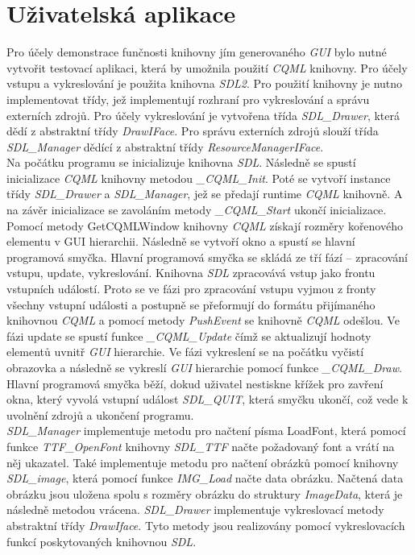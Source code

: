 \documentclass[11pt,twoside,a4paper]{book}
\begin{document}
\section{Uživatelská aplikace}
Pro účely demonstrace funčnosti knihovny jím generovaného \textit{GUI} bylo nutné vytvořit testovací aplikaci, která by umožnila použití \textit{CQML} knihovny.
Pro účely vstupu a vykreslování je použita knihovna \textit{SDL2}. Pro použití knihovny je nutno implementovat třídy, jež implementují rozhraní pro vykreslování a správu externích zdrojů. Pro účely vykreslování je vytvořena třída \textit{SDL\_Drawer}, která dědí z abstraktní třídy \textit{DrawIFace}. Pro správu externích zdrojů slouží třída \textit{SDL\_Manager} dědící z abstraktní třídy \textit{ResourceManagerIFace}.\\
Na počátku programu se inicializuje knihovna \textit{SDL}. Následně se spustí inicializace \textit{CQML} knihovny metodou \textit{\_CQML\_Init}. Poté se vytvoří instance třídy \textit{SDL\_Drawer} a \textit{SDL\_Manager}, jež se předají runtime \textit{CQML} knihovně. A na závěr inicializace se zavoláním metody \textit{\_CQML\_Start} ukončí inicializace. Pomocí metody GetCQMLWindow knihovny \textit{CQML} získají rozměry kořenového elementu v GUI hierarchii.
Následně se vytvoří okno a spustí se hlavní programová smyčka. Hlavní programová smyčka se skládá ze tří fází – zpracování vstupu, update, vykreslování.
Knihovna \textit{SDL} zpracovává vstup jako frontu vstupních událostí. Proto se ve fázi pro zpracování vstupu vyjmou z fronty všechny vstupní události a postupně se přeformují do formátu přijímaného knihovnou \textit{CQML} a pomocí metody \textit{PushEvent} se knihovně \textit{CQML} odešlou. Ve fázi update se spustí funkce \textit{\_CQML\_Update} čímž se aktualizují hodnoty elementů uvnitř \textit{GUI} hierarchie. Ve fázi vykreslení se na počátku vyčistí obrazovka a následně se vykreslí \textit{GUI} hierarchie pomocí funkce \textit{\_CQML\_Draw}. Hlavní programová smyčka běží, dokud uživatel nestiskne křížek pro zavření okna, který vyvolá vstupní událost \textit{SDL\_QUIT}, která smyčku ukončí, což vede k uvolnění zdrojů a ukončení programu.\\
\textit{SDL\_Manager} implementuje metodu pro načtení písma LoadFont, která pomocí funkce \textit{TTF\_OpenFont} knihovny \textit{SDL\_TTF} načte požadovaný font a vrátí na něj ukazatel. Také implementuje metodu pro načtení obrázků pomocí knihovny \textit{SDL\_image}, která pomocí funkce \textit{IMG\_Load} načte data obrázku. Načtená data obrázku jsou uložena spolu s rozměry obrázku do struktury \textit{ImageData}, která je následně metodou vrácena. 
\textit{SDL\_Drawer} implementuje vykreslovací metody abstraktní třídy \textit{DrawIface}. Tyto metody jsou realizovány pomocí vykreslovacích funkcí poskytovaných knihovnou \textit{SDL}.
\end{document}
